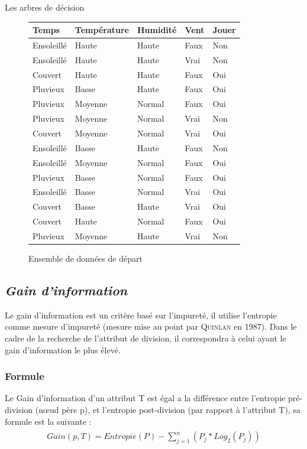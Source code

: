 \documentclass[a4paper, 11pt]{report}
\begin{document}
\begin{chapter}{Les arbres de décision}
\begin{figure}[!h]
\begin{center}
\begin{tabular}{| l | l | l | l | l |}
\hline
\rowcolor{gray!25}
Temps & Température & Humidité & Vent & Jouer \\
\hline
Ensoleillé & Haute & Haute & Faux & Non \\
\hline
Ensoleillé & Haute & Haute & Vrai & Non \\
\hline
Couvert & Haute & Haute & Faux & Oui \\
\hline
Pluvieux & Basse & Haute & Faux & Oui \\
\hline
Pluvieux & Moyenne & Normal & Faux & Oui \\
\hline
Pluvieux & Moyenne & Normal & Vrai & Non \\
\hline
Couvert & Moyenne & Normal & Vrai & Oui \\
\hline
Ensoleillé & Basse & Haute & Faux & Non \\
\hline
Ensoleillé & Moyenne & Normal & Faux & Oui \\
\hline
Pluvieux & Basse & Normal & Faux & Oui \\
\hline
Ensoleillé & Basse & Normal & Vrai & Oui \\
\hline
Couvert & Basse & Haute & Vrai & Oui \\
\hline
Couvert & Haute & Normal & Faux & Oui \\
\hline
Pluvieux & Moyenne & Haute & Vrai & Non \\
\hline
\end{tabular}
\caption{Ensemble de données de départ}
\end{center}
\end{figure}
\subsection*{\emph{Gain d'information}}
Le gain d'information est un critère basé sur l'impureté, il utilise l'entropie comme mesure d'impureté (mesure mise au point par \textsc{Quinlan} en 1987)\cite{singh2014comparative}. Dans le cadre de la recherche de l'attribut de division, il correspondra à celui ayant le gain d'information le plus élevé. 

\subsubsection*{Formule}
Le Gain d'information d'un attribut T est égal a la différence entre l'entropie pré-division (nœud père p), et l'entropie post-division (par rapport à l'attribut T), sa formule est la suivante :
\begin{align}
\begin{split}\label{formule:gain}
Gain(p,T) = Entropie(P) - \sum_{j=1}^n (P_j * Log_2(P_j))
\end{split}
\end{align}

\end{chapter}
\end{document}
